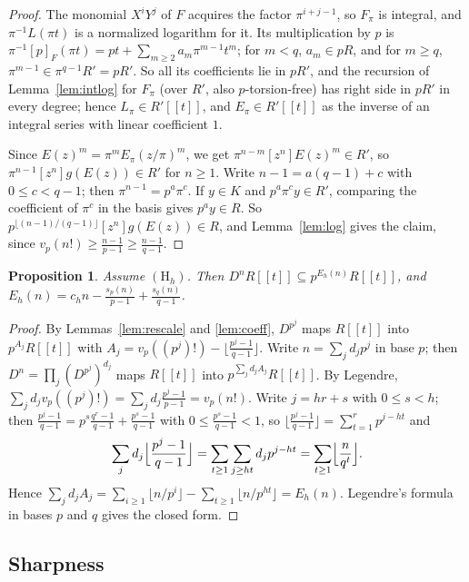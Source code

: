 \documentclass[11pt]{amsart}
\newtheorem{proposition}[thm]{Proposition}
\theoremstyle{definition}
\theoremstyle{remark}
\newcommand{\vp}{v_p}
\begin{document}
\begin{proof}
The monomial $X^iY^j$ of $F$ acquires the factor $\pi^{i+j-1}$, so $F_\pi$ is integral, and $\pi^{-1}L(\pi t)$ is a normalized logarithm for it. Its multiplication by $p$ is $\pi^{-1}[p]_F(\pi t)=pt+\sum_{m\ge2}a_m\pi^{m-1}t^m$; for $m<q$, $a_m\in pR$, and for $m\ge q$, $\pi^{m-1}\in\pi^{q-1}R'=pR'$. So all its coefficients lie in $pR'$, and the recursion of Lemma~\ref{lem:intlog} for $F_\pi$ (over $R'$, also $p$-torsion-free) has right side in $pR'$ in every degree; hence $L_\pi\in R'[[t]]$, and $E_\pi\in R'[[t]]$ as the inverse of an integral series with linear coefficient $1$.

Since $E(z)^m=\pi^mE_\pi(z/\pi)^m$, we get $\pi^{n-m}[z^n]E(z)^m\in R'$, so $\pi^{n-1}[z^n]g(E(z))\in R'$ for $n\ge1$. Write $n-1=a(q-1)+c$ with $0\le c<q-1$; then $\pi^{n-1}=p^a\pi^c$. If $y\in K$ and $p^a\pi^cy\in R'$, comparing the coefficient of $\pi^c$ in the basis gives $p^ay\in R$. So $p^{\lfloor(n-1)/(q-1)\rfloor}[z^n]g(E(z))\in R$, and Lemma~\ref{lem:log} gives the claim, since $\vp(n!)\ge\frac{n-1}{p-1}\ge\frac{n-1}{q-1}$.
\end{proof}

\begin{proposition}\label{prop:floor}
Assume $(\mathrm H_h)$. Then $D^nR[[t]]\subseteq p^{E_h(n)}R[[t]]$, and $E_h(n)=c_hn-\frac{s_p(n)}{p-1}+\frac{s_q(n)}{q-1}$.
\end{proposition}

\begin{proof}
By Lemmas~\ref{lem:rescale} and \ref{lem:coeff}, $D^{p^j}$ maps $R[[t]]$ into $p^{A_j}R[[t]]$ with $A_j=\vp((p^j)!)-\lfloor\frac{p^j-1}{q-1}\rfloor$. Write $n=\sum_jd_jp^j$ in base $p$; then $D^n=\prod_j(D^{p^j})^{d_j}$ maps $R[[t]]$ into $p^{\sum_jd_jA_j}R[[t]]$. By Legendre, $\sum_jd_j\vp((p^j)!)=\sum_jd_j\frac{p^j-1}{p-1}=\vp(n!)$. Write $j=hr+s$ with $0\le s<h$; then $\frac{p^j-1}{q-1}=p^s\frac{q^r-1}{q-1}+\frac{p^s-1}{q-1}$ with $0\le\frac{p^s-1}{q-1}<1$, so $\lfloor\frac{p^j-1}{q-1}\rfloor=\sum_{t=1}^{r}p^{j-ht}$ and
\[
 \sum_jd_j\Bigl\lfloor\frac{p^j-1}{q-1}\Bigr\rfloor=\sum_{t\ge1}\sum_{j\ge ht}d_jp^{j-ht}=\sum_{t\ge1}\Bigl\lfloor\frac n{q^t}\Bigr\rfloor .
\]
Hence $\sum_jd_jA_j=\sum_{i\ge1}\lfloor n/p^i\rfloor-\sum_{t\ge1}\lfloor n/p^{ht}\rfloor=E_h(n)$. Legendre's formula in bases $p$ and $q$ gives the closed form.
\end{proof}

\subsection{Sharpness}
\end{document}
